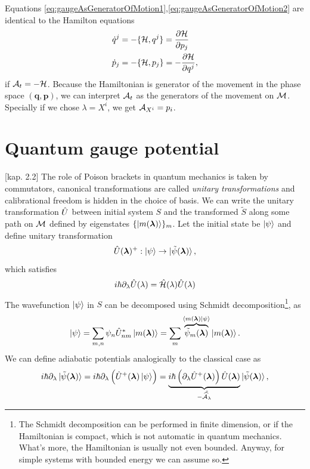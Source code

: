 Equations \ref{eq:gaugeAsGeneratorOfMotion1},\ref{eq:gaugeAsGeneratorOfMotion2} are identical to the Hamilton equations
\begin{equation}
\begin{split}
    \dot{q}^j&=-\{\mathcal{H},q^j\} = \frac{\partial \mathcal{H}}{\partial p_j}\\
    \dot{p}_j&=-\{\mathcal{H},p_j\} = -\frac{\partial \mathcal{H}}{\partial q^j},
\end{split}
\end{equation}
if $\mathcal{A}_t=-\mathcal{H}$. Because the Hamiltonian is generator of the movement in the phase space $(\bm{q},\bm{p})$, we can interpret $\mathcal{A}_t$ as the generators of the movement on $\mathcal{M}$. Specially if we chose $\lambda=X^i$, we get $\mathcal{A}_{X^i}=p_i$.




\section{Quantum gauge potential}
\citep{kolodrubez}[kap. 2.2]
The role of Poison brackets in quantum mechanics is taken by commutators, canonical transformations are called \emph{unitary transformations} and calibrational freedom is hidden in the choice of basis. We can write the unitary transformation $\hat{U}$ between initial system $S$ and the transformed $\tilde{S}$ along some path on $\mathcal{M}$ defined by eigenstates $\{\ket{m({\bm\lambda})}\}_m$. Let the initial state be $\ket{\psi}$ and define unitary transformation
\begin{equation}
    \hat{U}({\bm\lambda})^+: \ket{\psi} \rightarrow \ket{\tilde\psi({\bm\lambda})},
    \label{eq:transformationU}
\end{equation}
which satisfies
\begin{equation}
    i\hbar \partial_\lambda \hat{U}(\lambda)=\hat{\mathcal{H}}(\lambda)\hat{U}(\lambda)
\end{equation}
The wavefunction $\ket{\psi}$ in $S$ can be decomposed using Schmidt decomposition\footnote{The Schmidt decomposition can be performed in finite dimension, or if the Hamiltonian is compact, which is not automatic in quantum mechanics. What's more, the Hamiltonian is usually not even bounded. Anyway, for simple systems with bounded energy we can assume so.}, as
\begin{equation}
    \ket{\psi} = \sum_{m,n}\psi_n \hat{U}_{nm}^*\ket{m({\bm\lambda})} = \sum_m \overbrace{\tilde{\psi}_m({\bm\lambda})}^{\braket{m({\bm\lambda})|\psi}}\ket{m({\bm\lambda})}.
\end{equation}
We can define adiabatic potentials analogically to the classical case as
\begin{equation}
    i\hbar\partial_\lambda \ket{\tilde{\psi}({\bm\lambda})} = i\hbar \partial_\lambda\left(\hat{U}^+({\bm\lambda})\ket{\psi} \right)= \underbrace{i\hbar\left(\partial_\lambda \hat{U}^+({\bm\lambda})\right)\hat{U}({\bm\lambda})}_{-\tilde{\mathcal{\widehat{A}}_\lambda}}\ket{\tilde{\psi}({\bm\lambda})},
\end{equation}
